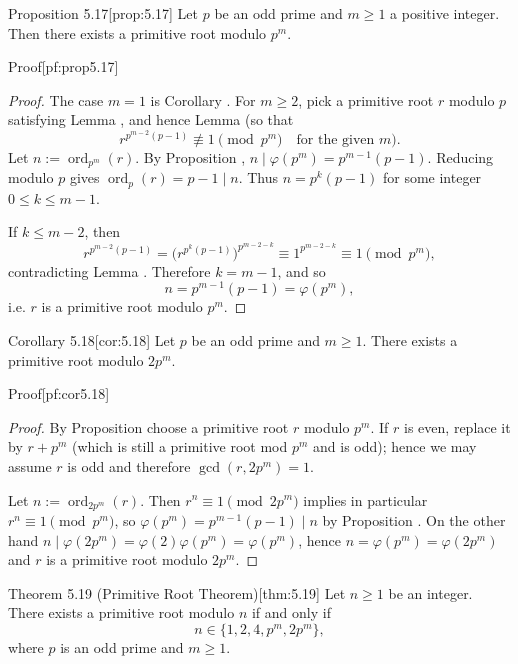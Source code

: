 \documentclass[10pt]{article}
\theoremstyle{definition}
\theoremstyle{plain}
\numberwithin{equation}{section}
\begin{document}
\begin{define}{Proposition 5.17}[prop:5.17]
Let $p$ be an odd prime and $m\ge1$ a positive integer. Then there exists a primitive root modulo $p^m$.
\end{define}

\begin{define}{Proof}[pf:prop5.17]
\begin{proof}
The case $m=1$ is Corollary . For $m\ge2$, pick a primitive root $r$ modulo $p$ satisfying Lemma , and hence Lemma  (so that
\[
r^{p^{m-2}(p-1)}\not\equiv 1\pmod{p^m}\quad\text{for the given }m).
\]
Let $n:=\operatorname{ord}_{p^m}(r)$. By Proposition , $n\mid\varphi(p^m)=p^{m-1}(p-1)$. Reducing modulo $p$ gives $\operatorname{ord}_p(r)=p-1\mid n$. Thus $n=p^k(p-1)$ for some integer $0\le k\le m-1$.

If $k\le m-2$, then
\[
r^{p^{m-2}(p-1)}=\bigl(r^{p^k(p-1)}\bigr)^{p^{m-2-k}}\equiv 1^{p^{m-2-k}}\equiv 1\pmod{p^m},
\]
contradicting Lemma . Therefore $k=m-1$, and so
\[
n=p^{m-1}(p-1)=\varphi(p^m),
\]
i.e. $r$ is a primitive root modulo $p^m$.
\end{proof}
\end{define}

\begin{define}{Corollary 5.18}[cor:5.18]
Let $p$ be an odd prime and $m\ge1$. There exists a primitive root modulo $2p^m$.
\end{define}

\begin{define}{Proof}[pf:cor5.18]
\begin{proof}
By Proposition  choose a primitive root $r$ modulo $p^m$. If $r$ is even, replace it by $r+p^m$ (which is still a primitive root mod $p^m$ and is odd); hence we may assume $r$ is odd and therefore $\gcd(r,2p^m)=1$.

Let $n:=\operatorname{ord}_{2p^m}(r)$. Then $r^n\equiv1\pmod{2p^m}$ implies in particular $r^n\equiv1\pmod{p^m}$, so $\varphi(p^m)=p^{m-1}(p-1)\mid n$ by Proposition . On the other hand $n\mid\varphi(2p^m)=\varphi(2)\varphi(p^m)=\varphi(p^m)$, hence $n=\varphi(p^m)=\varphi(2p^m)$ and $r$ is a primitive root modulo $2p^m$.
\end{proof}
\end{define}

\begin{define}{Theorem 5.19 (Primitive Root Theorem)}[thm:5.19]
Let $n\ge1$ be an integer. There exists a primitive root modulo $n$ if and only if
\[
n\in\{1,2,4,p^m,2p^m\},
\]
where $p$ is an odd prime and $m\ge1$.
\end{define}
\end{document}
